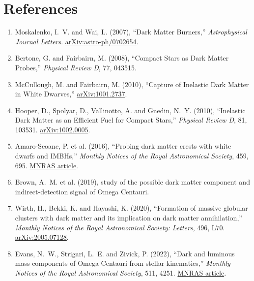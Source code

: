 \documentclass[11pt,a4paper]{article}
\begin{document}
\section*{References}

\begin{enumerate}[leftmargin=*]

\item Moskalenko, I.~V. and Wai, L. (2007),
``Dark Matter Burners,''
\emph{Astrophysical Journal Letters}.
\href{https://arxiv.org/abs/astro-ph/0702654}
{arXiv:astro-ph/0702654}.

\item Bertone, G. and Fairbairn, M. (2008),
``Compact Stars as Dark Matter Probes,''
\emph{Physical Review D}, 77, 043515.

\item McCullough, M. and Fairbairn, M. (2010),
``Capture of Inelastic Dark Matter in White Dwarves,''
\href{https://arxiv.org/abs/1001.2737}
{arXiv:1001.2737}.

\item Hooper, D., Spolyar, D., Vallinotto, A. and Gnedin, N.~Y. (2010),
``Inelastic Dark Matter as an Efficient Fuel for Compact Stars,''
\emph{Physical Review D}, 81, 103531.
\href{https://arxiv.org/abs/1002.0005}{arXiv:1002.0005}.

\item Amaro-Seoane, P. et al. (2016),
``Probing dark matter crests with white dwarfs and IMBHs,''
\emph{Monthly Notices of the Royal Astronomical Society}, 459, 695.
\href{https://academic.oup.com/mnras/article/459/1/695/2608788}
{MNRAS article}.

\item Brown, A.~M. et al. (2019),
study of the possible dark matter component and indirect-detection signal of Omega Centauri.

\item Wirth, H., Bekki, K. and Hayashi, K. (2020),
``Formation of massive globular clusters with dark matter and its implication on dark matter annihilation,''
\emph{Monthly Notices of the Royal Astronomical Society: Letters}, 496, L70.
\href{https://arxiv.org/abs/2005.07128}
{arXiv:2005.07128}.

\item Evans, N.~W., Strigari, L.~E. and Zivick, P. (2022),
``Dark and luminous mass components of Omega Centauri from stellar kinematics,''
\emph{Monthly Notices of the Royal Astronomical Society}, 511, 4251.
\href{https://academic.oup.com/mnras/article/511/3/4251/6517696}
{MNRAS article}.


\end{enumerate}
\end{document}
